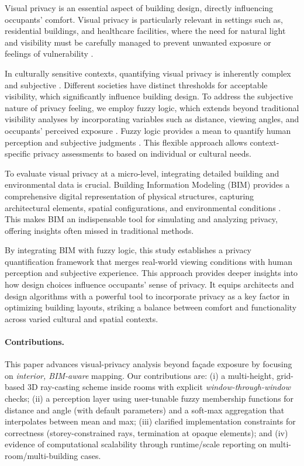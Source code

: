 \documentclass[final,3p,times,review]{elsarticle}
\begin{document}
Visual privacy is an essential aspect of building design, directly influencing occupants' comfort\cite{ day2020}. Visual privacy is particularly relevant in settings such as, residential buildings, and healthcare facilities, where the need for natural light and visibility must be carefully managed to prevent unwanted exposure or feelings of vulnerability \cite{kwong2020, peng2024}.

In culturally sensitive contexts, quantifying visual privacy is inherently complex and subjective \cite{kent2020}. Different societies have distinct thresholds for acceptable visibility, which significantly influence building design. To address the subjective nature of privacy feeling, we employ fuzzy logic, which extends beyond traditional visibility analyses by incorporating variables such as distance, viewing angles, and occupants' perceived exposure \cite{kim2013}. Fuzzy logic provides a mean to quantify human perception and subjective judgments \cite{zadeh1996,shepard2005,zadeh2015}. This flexible approach allows context-specific privacy assessments to based on individual or cultural needs.

To evaluate visual privacy at a micro-level, integrating detailed building and environmental data is crucial. Building Information Modeling (BIM) provides a comprehensive digital representation of physical structures, capturing architectural elements, spatial configurations, and environmental conditions \cite{liu2015,lu2017, chong2017,llatas2020,olanrewaju2022}. This makes BIM an indispensable tool for simulating and analyzing privacy, offering insights often missed in traditional methods.

By integrating BIM with fuzzy logic, this study establishes a privacy quantification framework that merges real-world viewing conditions with human perception and subjective experience. This approach provides deeper insights into how design choices influence occupants' sense of privacy. It equips architects and design algorithms with a powerful tool to incorporate privacy as a key factor in optimizing building layouts, striking a balance between comfort and functionality across varied cultural and spatial contexts.

\paragraph{Contributions.}
This paper advances visual-privacy analysis beyond façade exposure by focusing on \textit{interior, BIM-aware} mapping. Our contributions are:
(i) a multi-height, grid-based 3D ray-casting scheme inside rooms with explicit \emph{window-through-window} checks;
(ii) a perception layer using user-tunable fuzzy membership functions for distance and angle (with default parameters) and a soft-max aggregation that interpolates between mean and max;
(iii) clarified implementation constraints for correctness (storey-constrained rays, termination at opaque elements); and
(iv) evidence of computational scalability through runtime/scale reporting on multi-room/multi-building cases.
\end{document}
